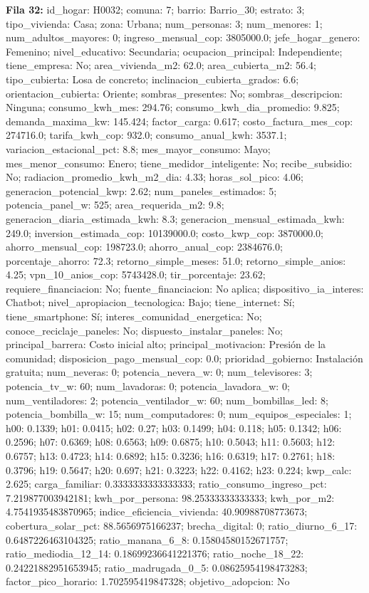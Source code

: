 {\footnotesize\textbf{Fila 32:} id\_hogar: H0032; comuna: 7; barrio: Barrio\_30; estrato: 3; tipo\_vivienda: Casa; zona: Urbana; num\_personas: 3; num\_menores: 1; num\_adultos\_mayores: 0; ingreso\_mensual\_cop: 3805000.0; jefe\_hogar\_genero: Femenino; nivel\_educativo: Secundaria; ocupacion\_principal: Independiente; tiene\_empresa: No; area\_vivienda\_m2: 62.0; area\_cubierta\_m2: 56.4; tipo\_cubierta: Losa de concreto; inclinacion\_cubierta\_grados: 6.6; orientacion\_cubierta: Oriente; sombras\_presentes: No; sombras\_descripcion: Ninguna; consumo\_kwh\_mes: 294.76; consumo\_kwh\_dia\_promedio: 9.825; demanda\_maxima\_kw: 145.424; factor\_carga: 0.617; costo\_factura\_mes\_cop: 274716.0; tarifa\_kwh\_cop: 932.0; consumo\_anual\_kwh: 3537.1; variacion\_estacional\_pct: 8.8; mes\_mayor\_consumo: Mayo; mes\_menor\_consumo: Enero; tiene\_medidor\_inteligente: No; recibe\_subsidio: No; radiacion\_promedio\_kwh\_m2\_dia: 4.33; horas\_sol\_pico: 4.06; generacion\_potencial\_kwp: 2.62; num\_paneles\_estimados: 5; potencia\_panel\_w: 525; area\_requerida\_m2: 9.8; generacion\_diaria\_estimada\_kwh: 8.3; generacion\_mensual\_estimada\_kwh: 249.0; inversion\_estimada\_cop: 10139000.0; costo\_kwp\_cop: 3870000.0; ahorro\_mensual\_cop: 198723.0; ahorro\_anual\_cop: 2384676.0; porcentaje\_ahorro: 72.3; retorno\_simple\_meses: 51.0; retorno\_simple\_anios: 4.25; vpn\_10\_anios\_cop: 5743428.0; tir\_porcentaje: 23.62; requiere\_financiacion: No; fuente\_financiacion: No aplica; dispositivo\_ia\_interes: Chatbot; nivel\_apropiacion\_tecnologica: Bajo; tiene\_internet: Sí; tiene\_smartphone: Sí; interes\_comunidad\_energetica: No; conoce\_reciclaje\_paneles: No; dispuesto\_instalar\_paneles: No; principal\_barrera: Costo inicial alto; principal\_motivacion: Presión de la comunidad; disposicion\_pago\_mensual\_cop: 0.0; prioridad\_gobierno: Instalación gratuita; num\_neveras: 0; potencia\_nevera\_w: 0; num\_televisores: 3; potencia\_tv\_w: 60; num\_lavadoras: 0; potencia\_lavadora\_w: 0; num\_ventiladores: 2; potencia\_ventilador\_w: 60; num\_bombillas\_led: 8; potencia\_bombilla\_w: 15; num\_computadores: 0; num\_equipos\_especiales: 1; h00: 0.1339; h01: 0.0415; h02: 0.27; h03: 0.1499; h04: 0.118; h05: 0.1342; h06: 0.2596; h07: 0.6369; h08: 0.6563; h09: 0.6875; h10: 0.5043; h11: 0.5603; h12: 0.6757; h13: 0.4723; h14: 0.6892; h15: 0.3236; h16: 0.6319; h17: 0.2761; h18: 0.3796; h19: 0.5647; h20: 0.697; h21: 0.3223; h22: 0.4162; h23: 0.224; kwp\_calc: 2.625; carga\_familiar: 0.3333333333333333; ratio\_consumo\_ingreso\_pct: 7.219877003942181; kwh\_por\_persona: 98.25333333333333; kwh\_por\_m2: 4.7541935483870965; indice\_eficiencia\_vivienda: 40.90988708773673; cobertura\_solar\_pct: 88.5656975166237; brecha\_digital: 0; ratio\_diurno\_6\_17: 0.6487226463104325; ratio\_manana\_6\_8: 0.15804580152671757; ratio\_mediodia\_12\_14: 0.18699236641221376; ratio\_noche\_18\_22: 0.24221882951653945; ratio\_madrugada\_0\_5: 0.08625954198473283; factor\_pico\_horario: 1.702595419847328; objetivo\_adopcion: No\par}
